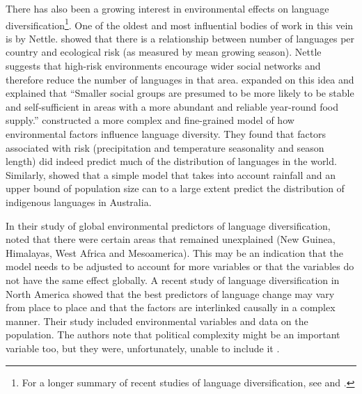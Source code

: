 \documentclass[unnumsec,webpdf,modern,medium]{oup-authoring-template}
\begin{document}

There has also been a growing interest in environmental effects on language diversification\footnote{For a longer summary of recent studies of language diversification, see \citet{gavin2013toward} and \citet{greenhill2015demographic}.}. One of the oldest and most influential bodies of work in this vein is by Nettle. \citet{NETTLE1998} showed that there is a relationship between number of languages per country and ecological risk (as measured by mean growing season). Nettle suggests that high-risk environments encourage wider social networks and therefore reduce the number of languages in that area. \citet{hua2019ecological} expanded on this idea and explained that ``Smaller social groups are presumed to be more likely to be stable and self-sufficient in areas with a more abundant and reliable year-round food supply.'' \citet{hua2019ecological} constructed a more complex and fine-grained model of how environmental factors influence language diversity. They found that factors associated with risk (precipitation and temperature seasonality and season length) did indeed predict much of the distribution of languages in the world. Similarly, \citet{gavin2017process} showed that a simple model that takes into account rainfall and an upper bound of population size can to a large extent predict the distribution of indigenous languages in Australia. 


In their study of global environmental predictors of language diversification, \citet{hua2019ecological} noted that there were certain areas that remained unexplained (New Guinea, Himalayas, West Africa and Mesoamerica). This may be an indication that the model needs to be adjusted to account for more variables or that the variables do not have the same effect globally. A recent study of language diversification in North America \citep{Pacheco_Coelho_2019} showed that the best predictors of language change may vary from place to place and that the factors are interlinked causally in a complex manner. Their study included environmental variables and data on the population. The authors note that political complexity might be an important variable too, but they were, unfortunately, unable to include it \citep[7]{Pacheco_Coelho_2019}.
\end{document}
